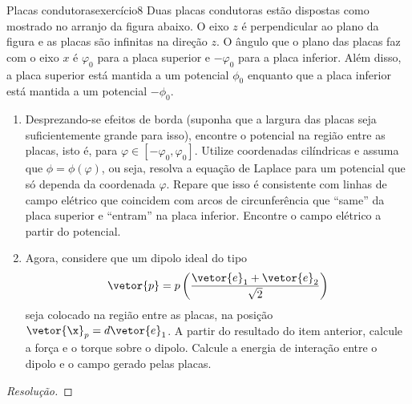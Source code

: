 \begin{exercício}{Placas condutoras}{exercício8}
    Duas placas condutoras estão dispostas como mostrado no arranjo da figura abaixo. O eixo \(z\) é perpendicular ao plano da figura e as placas são infinitas na direção \(z\). O ângulo que o plano das placas faz com o eixo \(x\) é \(\varphi_0\) para a placa superior e \(-\varphi_0\) para a placa inferior. Além disso, a placa superior está mantida a um potencial \(\phi_0\) enquanto que a placa inferior está mantida a um potencial \(-\phi_0\).
    \begin{center}

    \end{center}
    \begin{enumerate}[label=(\alph*)]
        \item Desprezando-se efeitos de borda (suponha que a largura das placas seja suficientemente grande para isso), encontre o potencial na região entre as placas, isto é, para \(\varphi \in [-\varphi_0, \varphi_0]\). Utilize coordenadas cilíndricas e assuma que \(\phi = \phi(\varphi)\), ou seja, resolva a equação de Laplace para um potencial que só dependa da coordenada \(\varphi\). Repare que isso é consistente com linhas de campo elétrico que coincidem com arcos de circunferência que \enquote{same} da placa superior e \enquote{entram} na placa inferior. Encontre o campo elétrico a partir do potencial.
        \item Agora, considere que um dipolo ideal do tipo
            \begin{equation*}
                \vetor{p} = p\left(\frac{\vetor{e}_1 + \vetor{e}_2}{\sqrt{2}}\right)
            \end{equation*}
            seja colocado na região entre as placas, na posição \(\vetor{\x}_p = d\vetor{e}_1\). A partir do resultado do item anterior, calcule a força e o torque sobre o dipolo. Calcule a energia de interação entre o dipolo e o campo gerado pelas placas.
    \end{enumerate}
\end{exercício}
\begin{proof}[Resolução]

\end{proof}
